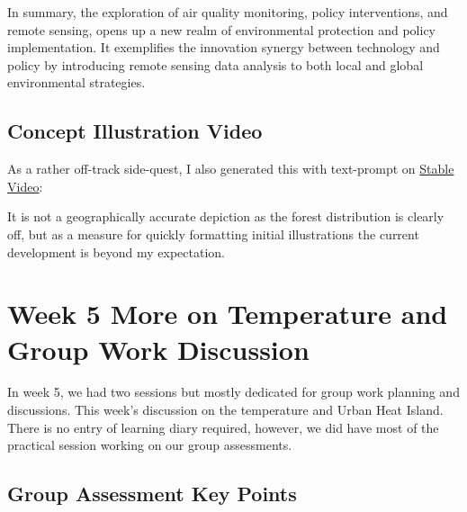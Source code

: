 \documentclass[
  letterpaper,
  DIV=11,
  numbers=noendperiod]{scrreprt}
\begin{document}
In summary, the exploration of air quality monitoring, policy
interventions, and remote sensing, opens up a new realm of environmental
protection and policy implementation. It exemplifies the innovation
synergy between technology and policy by introducing remote sensing data
analysis to both local and global environmental strategies.

\hypertarget{concept-illustration-video}{%
\section*{Concept Illustration Video}\label{concept-illustration-video}}


As a rather off-track side-quest, I also generated this with text-prompt
on \href{https://www.stablevideo.com/}{Stable Video}:

It is not a geographically accurate depiction as the forest distribution
is clearly off, but as a measure for quickly formatting initial
illustrations the current development is beyond my expectation.

\hypertarget{week-5-more-on-temperature-and-group-work-discussion}{%
\chapter*{Week 5 More on Temperature and Group Work
Discussion}\label{week-5-more-on-temperature-and-group-work-discussion}}


In week 5, we had two sessions but mostly dedicated for group work
planning and discussions. This week's discussion on the temperature and
Urban Heat Island. There is no entry of learning diary required,
however, we did have most of the practical session working on our group
assessments.

\hypertarget{group-assessment-key-points}{%
\section*{Group Assessment Key
Points}\label{group-assessment-key-points}}

\end{document}
